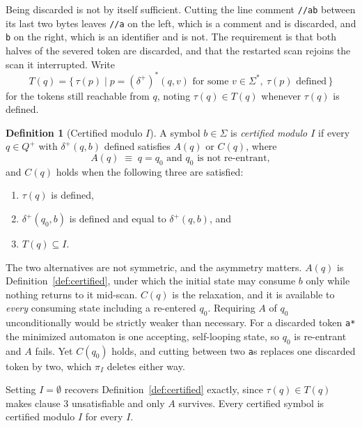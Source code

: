 \documentclass[11pt,a4paper]{article}
\theoremstyle{definition}
\newtheorem{definition}{Definition}
\theoremstyle{plain}
\newcommand{\code}[1]{\texttt{#1}}
\begin{document}
Being discarded is not by itself sufficient. Cutting the line comment \code{//ab} between its last two bytes leaves
\code{//a} on the left, which is a comment and is discarded, and \code{b} on the right, which is an identifier and is
not. The requirement is that both halves of the severed token are discarded, and that the restarted scan rejoins the
scan it interrupted. Write
\[
T(q) = \{\, \tau(p) \mid p = (\delta^+)^*(q, v) \text{ for some } v \in \Sigma^*,\ \tau(p) \text{ defined} \,\}
\]
for the tokens still reachable from $q$, noting $\tau(q) \in T(q)$ whenever $\tau(q)$ is defined.

\begin{definition}[Certified modulo $I$]
\label{def:trivia-certified}
A symbol $b \in \Sigma$ is \emph{certified modulo $I$} if every $q \in Q^+$ with $\delta^+(q, b)$ defined satisfies
$A(q)$ or $C(q)$, where
\[
A(q) \;\equiv\; q = q_0 \text{ and } q_0 \text{ is not re-entrant},
\]
and $C(q)$ holds when the following three are satisfied:
\begin{enumerate}
  \item $\tau(q)$ is defined,
  \item $\delta^+(q_0, b)$ is defined and equal to $\delta^+(q, b)$, and
  \item $T(q) \subseteq I$.
\end{enumerate}
\end{definition}

The two alternatives are not symmetric, and the asymmetry matters. $A(q)$ is Definition~\ref{def:certified}, under which
the initial state may consume $b$ only while nothing returns to it mid-scan. $C(q)$ is the relaxation, and it is
available to \emph{every} consuming state including a re-entered $q_0$. Requiring $A$ of $q_0$ unconditionally would be
strictly weaker than necessary. For a discarded token \code{a*} the minimized automaton is one accepting, self-looping
state, so $q_0$ is re-entrant and $A$ fails. Yet $C(q_0)$ holds, and cutting between two \code{a}s replaces one
discarded token by two, which $\pi_I$ deletes either way.

Setting $I = \emptyset$ recovers Definition~\ref{def:certified} exactly, since $\tau(q) \in T(q)$ makes clause 3
unsatisfiable and only $A$ survives. Every certified symbol is certified modulo $I$ for every $I$.
\end{document}
